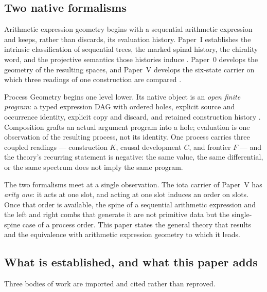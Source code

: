 
\subsection{Two native formalisms}

Arithmetic expression geometry begins with a sequential arithmetic expression and
keeps, rather than discards, its evaluation history.  Paper~I establishes the
intrinsic classification of sequential trees, the marked spinal history, the
chirality word, and the projective semantics those histories induce
\cite{Yuan2026AEGFoundations}.  Paper~0 develops the geometry of the resulting
spaces, and Paper~V develops the six-state carrier on which three readings of one
construction are compared \cite{Yuan2026AEGPaperZero,Yuan2026AEGPaperFive}.

Process Geometry begins one level lower.  Its native object is an \emph{open finite
program}: a typed expression DAG with ordered holes, explicit source and occurrence
identity, explicit copy and discard, and retained construction history
\cite{AdvaProcessCore2026,ProcessGeometryCore2026}.  Composition grafts an actual argument program into
a hole; evaluation is one observation of the resulting process, not its identity.
One process carries three coupled readings --- construction $K$, causal development
$C$, and frontier $F$ --- and the theory's recurring statement is negative: the same
value, the same differential, or the same spectrum does not imply the same program.

The two formalisms meet at a single observation.  The iota carrier of Paper~V has
\emph{arity one}: it acts at one slot, and acting at one slot induces an order on
slots.  Once that order is available, the spine of a sequential arithmetic
expression and the left and right combs that generate it are not primitive data but
the single-spine case of a process order.  This paper states the general theory that
results and the equivalence with arithmetic expression geometry to which it leads.

\subsection{What is established, and what this paper adds}

Three bodies of work are imported and cited rather than reproved.

